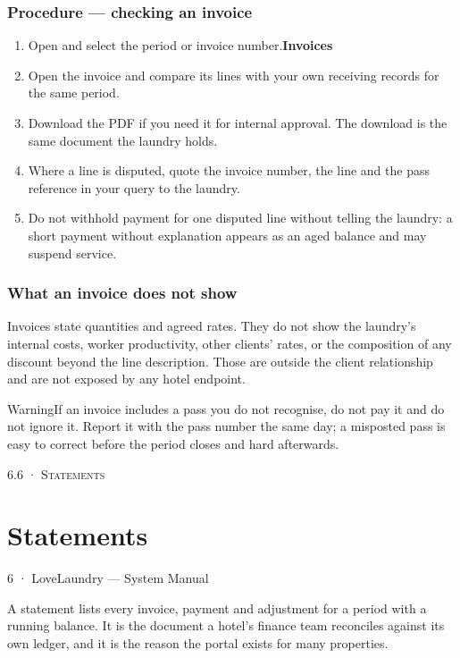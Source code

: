 \documentclass[11pt,a4paper,oneside]{book}
\begin{document}
\subsubsection*{Procedure — checking an invoice}
\begin{enumerate}
\item Open  and select the period or invoice number.\textbf{Invoices}
\item Open the invoice and compare its lines with your own receiving records for the same period.
\item Download the PDF if you need it for internal approval. The download is the same document the laundry holds.
\item Where a line is disputed, quote the invoice number, the line and the pass reference in your query to the laundry.
\item Do not withhold payment for one disputed line without telling the laundry: a short payment without explanation appears as an aged balance and may suspend service.
\end{enumerate}
\subsubsection*{What an invoice does not show}
Invoices state quantities and agreed rates. They do not show the laundry's internal costs, worker productivity, other clients' rates, or the composition of any discount beyond the line description. Those are outside the client relationship and are not exposed by any hotel endpoint.

\begin{notebox}WarningIf an invoice includes a pass you do not recognise, do not pay it and do not ignore it. Report it with the pass number the same day; a misposted pass is easy to correct before the period closes and hard afterwards.\end{notebox}
\textsc{\small\color{crimson}6.6 · Statements}\par\medskip
\section*{Statements}
6 · LoveLaundry — System Manual

A statement lists every invoice, payment and adjustment for a period with a running balance. It is the document a hotel's finance team reconciles against its own ledger, and it is the reason the portal exists for many properties.
\end{document}
